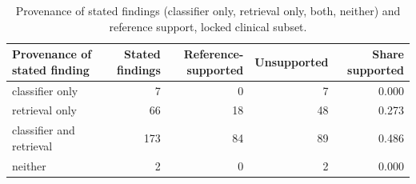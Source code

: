 \begin{table}[t]
\centering
\scriptsize
\begin{tabular}{lrrrr}
\hline
Provenance of stated finding & Stated findings & Reference-supported & Unsupported & Share supported \\
\hline
classifier only & 7 & 0 & 7 & 0.000 \\
retrieval only & 66 & 18 & 48 & 0.273 \\
classifier and retrieval & 173 & 84 & 89 & 0.486 \\
neither & 2 & 0 & 2 & 0.000 \\
\hline
\end{tabular}
\caption{Provenance of stated findings (classifier only, retrieval only, both, neither) and reference support, locked clinical subset.}
\label{tab:table11_supplementary_provenance}
\end{table}
